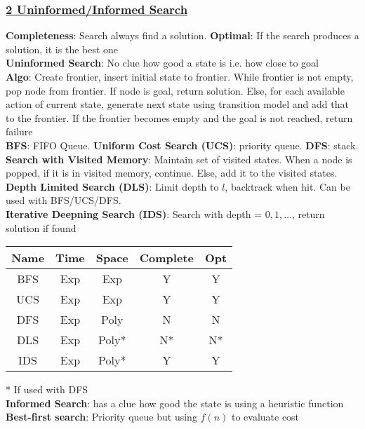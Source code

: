 \documentclass{article}
\begin{document}
\begin{multicols*}{3}
\subsubsection*{\underline{2 Uninformed/Informed Search}}
\textbf{Completeness}: Search always find a solution. \textbf{Optimal}: If the search produces a solution, it is the best one\\
\textbf{Uninformed Search}: No clue how good a state is i.e. how close to goal \\
\textbf{Algo}: Create frontier, insert initial state to frontier. While frontier is not empty, pop node from frontier. If node is goal, return solution. Else, for each available action of current state, generate next state using transition model and add that to the frontier. If the frontier becomes empty and the goal is not reached, return failure \\
\textbf{BFS}: FIFO Queue. \textbf{Uniform Cost Search (UCS)}: priority queue. \textbf{DFS}: stack.\\
\textbf{Search with Visited Memory}: Maintain set of visited states. When a node is popped, if it is in visited memory, continue. Else, add it to the visited states. \\
\textbf{Depth Limited Search (DLS)}: Limit depth to $l$, backtrack when hit. Can be used with BFS/UCS/DFS. \\
\textbf{Iterative Deepning Search (IDS)}: Search with depth = $0,1,\dots$, return solution if found \\
\begin{center}
\vspace{-0.8cm}
\hspace*{-\leftskip}
    \begin{tabular}{|c|c|c|c|c|}
    \hline
    Name & Time & Space & Complete & Opt \\ \hline
    BFS & Exp & Exp & Y & Y \\  \hline
    UCS & Exp & Exp & Y & Y \\ \hline
    DFS & Exp & Poly & N & N \\ \hline
    DLS & Exp & Poly* & N* & N* \\ \hline
    IDS & Exp & Poly* & Y & Y \\
    \hline
    \end{tabular}
\end{center}
* If used with DFS\\
\textbf{Informed Search}: has a clue how good the state is using a heuristic function \\
\textbf{Best-first search}: Priority queue but using $f(n)$ to evaluate cost \\

\end{multicols*}
\end{document}
